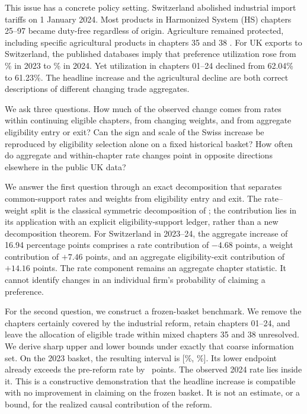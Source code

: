 \documentclass[11pt,a4paper]{article}
\begin{document}
This issue has a concrete policy setting. Switzerland abolished industrial import tariffs on 1 January 2024. Most products in Harmonized System (HS) chapters 25--97 became duty-free regardless of origin. Agriculture remained protected, including specific agricultural products in chapters 35 and 38 \citep{seco2026}. For UK exports to Switzerland, the published databases imply that preference utilization rose from \SwissBefore\% in 2023 to \SwissAfter\% in 2024. Yet utilization in chapters 01--24 declined from 62.04\% to 61.23\%. The headline increase and the agricultural decline are both correct descriptions of different changing trade aggregates.

We ask three questions. How much of the observed change comes from rates within continuing eligible chapters, from changing weights, and from aggregate eligibility entry or exit? Can the sign and scale of the Swiss increase be reproduced by eligibility selection alone on a fixed historical basket? How often do aggregate and within-chapter rate changes point in opposite directions elsewhere in the public UK data?

We answer the first question through an exact decomposition that separates common-support rates and weights from eligibility entry and exit. The rate--weight split is the classical symmetric decomposition of \citet{kitagawa1955}; the contribution lies in its application with an explicit eligibility-support ledger, rather than a new decomposition theorem. For Switzerland in 2023--24, the aggregate increase of 16.94 percentage points comprises a rate contribution of $-4.68$ points, a weight contribution of $+7.46$ points, and an aggregate eligibility-exit contribution of $+14.16$ points. The rate component remains an aggregate chapter statistic. It cannot identify changes in an individual firm's probability of claiming a preference.

For the second question, we construct a frozen-basket benchmark. We remove the chapters certainly covered by the industrial reform, retain chapters 01--24, and leave the allocation of eligible trade within mixed chapters 35 and 38 unresolved. We derive sharp upper and lower bounds under exactly that coarse information set. On the 2023 basket, the resulting interval is [\LowerBound\%, \UpperBound\%]. Its lower endpoint already exceeds the pre-reform rate by \MinSelection\ points. The observed 2024 rate lies inside it. This is a constructive demonstration that the headline increase is compatible with no improvement in claiming on the frozen basket. It is not an estimate, or a bound, for the realized causal contribution of the reform.
\end{document}
